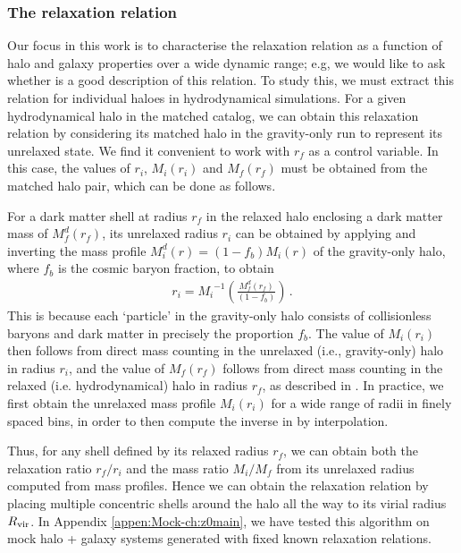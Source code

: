 \subsubsection{The relaxation relation} %
\label{sec:methods-relx-reln-ch:z0main}
Our focus in this work is to characterise the relaxation relation  as a function of halo and galaxy properties over a wide dynamic range; e.g, we would like to ask whether  is a good description of this relation.
To study this, we must extract this relation for individual haloes in hydrodynamical simulations.
For a given hydrodynamical halo in the matched catalog, we can obtain this relaxation relation by considering its matched halo in the gravity-only run to represent its unrelaxed state. 
We find it convenient to work with $r_f$ as a control variable. In this case, the values of $r_i$, $M_i(r_i)$ and $M_f(r_f)$ must be obtained from the matched halo pair, which can be done as follows.

For a dark matter shell at radius $r_f$ in the relaxed halo enclosing a dark matter mass of $M_f^d(r_f)$, its unrelaxed radius $r_i$ can be obtained by applying  and inverting the mass profile $M_i^d(r)=(1-f_b) M_i(r)$ of the gravity-only halo, where $f_b$ is the cosmic baryon fraction, to obtain 
\begin{align}
\label{eq:inv-mass-ch:z0main}
r_i = {M_i}^{-1} \left( \frac{M_f^d(r_f)}{(1-f_b)} \right)\,.
\end{align}
This is because each `particle' in the gravity-only halo consists of collisionless baryons and dark matter in precisely the proportion $f_{b}$. 
The value of $M_i(r_i)$ then follows from direct mass counting in the unrelaxed (i.e., gravity-only) halo in radius $r_i$, and the value of $M_f(r_f)$ follows from direct mass counting in the relaxed (i.e. hydrodynamical) halo in radius $r_f$, as described in . In practice, we first obtain the unrelaxed mass profile $M_i(r_i)$ for a wide range of radii in finely spaced bins, in order to then compute the inverse in  by interpolation.

Thus, for any shell defined by its relaxed radius $r_f$, we can obtain both the relaxation ratio $r_f/r_i$ and the mass ratio $M_i/M_f$ from its unrelaxed radius computed from mass profiles. Hence we can obtain the relaxation relation by placing multiple concentric shells around the halo all the way to its virial radius $R_{\rm{vir}}$.
In Appendix \ref{appen:Mock-ch:z0main}, we have tested this algorithm on mock halo + galaxy systems generated with fixed known relaxation relations.


